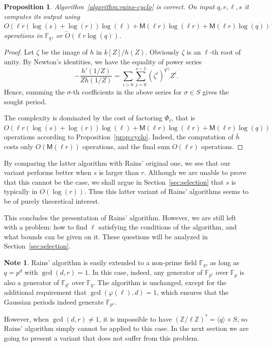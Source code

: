 \documentclass[12pt]{article}
\theoremstyle{plain}
\newtheorem{proposition}[theorem]{Proposition}
\theoremstyle{definition}
\newtheorem{note}[theorem]{Note}
\newcommand{\tildO}{\tilde{O}}
\def\Z{\ensuremath{\mathbb{Z}}}
\def\F{\ensuremath{\mathbb{F}}}
\def\MM{\ensuremath{\mathsf{M}}}
\def\euler{\ensuremath{\varphi}}
\newcounter{algorithm}
\begin{document}
\begin{proposition}
  Algorithm~\ref{algorithm:rains-cyclo} is correct. On input
  $q,r,\ell,s$ it computes its output using
  $O(\ell r(\log(s)+\log(r))\log(\ell) + \MM(\ell r)\log(\ell r) +
  \MM(\ell r)\log(q))$ operations in $\F_q$, or $\tildO(\ell r\log (q))$.
\end{proposition}
\begin{proof}
  Let $\zeta$ be the image of $h$ in $k[Z]/h(Z)$. Obviously $\zeta$ is
  an $\ell$-th root of unity. By Newton's identities, we have the
  equality of power series
  \begin{equation*}
    -\frac{h'(1/Z)}{Zh(1/Z)} = \sum_{i>0}\sum_{j=0}^{s-1}(\zeta^i)^{q^{rj}} Z^i.
  \end{equation*}
  Hence, summing the $\sigma$-th coefficients in the above series for
  $\sigma\in S$ gives the sought period.

  The complexity is dominated by the cost of factoring $\Phi_\ell$,
  that is
  $O(\ell r(\log(s)+\log(r))\log(\ell) + \MM(\ell r)\log(\ell r) +
  \MM(\ell r)\log(q))$ operations according to
  Proposition~\ref{prop:cyclo}. Indeed, the computation of $\bar{h}$
  costs only $O(\MM(\ell r))$ operations, and the final sum
  $O(\ell r)$ operations.
\end{proof}

By comparing the latter algorithm with Rains' original one, we see
that our variant performs better when $s$ is larger than $r$. Although
we are unable to prove that this cannot be the case, we shall argue in
Section~\ref{sec:selection} that $s$ is typically in
$O(\log(r))$. Thus this latter variant of Rains' algorithms seems to
be of purely theoretical interest.

This concludes the presentation of Rains' algorithm. However, we are
still left with a problem: how to find $\ell$ satisfying the
conditions of the algorithm, and what bounds can be given on it. These
questions will be analyzed in Section~\ref{sec:selection}.

\begin{note}
  \label{note:rains-non-prime}
  Rains' algorithm is easily extended to a non-prime field $\F_q$, as
  long as $q=p^d$ with $\gcd(d,r)=1$. In this case, indeed, any
  generator of $\F_{p^r}$ over $\F_p$ is also a generator of
  $\F_{q^r}$ over $\F_q$. The algorithm is unchanged, except for the
  additional requirement that $\gcd(\euler(\ell),d)=1$, which ensures
  that the Gaussian periods indeed generate $\F_{p^r}$.

  However, when $\gcd(d,r)\ne 1$, it is impossible to have
  $(\Z/\ell\Z)^\ast=\langle q\rangle\times S$, so Rains' algorithm
  simply cannot be applied to this case. In the next section we are
  going to present a variant that does not suffer from this problem.
\end{note}
\end{document}
